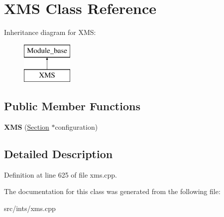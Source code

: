 \hypertarget{classXMS}{\section{X\-M\-S Class Reference}
\label{classXMS}
}
Inheritance diagram for X\-M\-S\-:\begin{figure}[H]
\begin{center}
\leavevmode
\includegraphics[height=2.000000cm]{classXMS}
\end{center}
\end{figure}
\subsection*{Public Member Functions}
\begin{DoxyCompactItemize}
\item 
\hypertarget{classXMS_a09c1f705bac7231151e025c1444f8c2c}{{\bfseries X\-M\-S} (\hyperlink{classSection}{Section} $\ast$configuration)}\label{classXMS_a09c1f705bac7231151e025c1444f8c2c}

\end{DoxyCompactItemize}


\subsection{Detailed Description}


Definition at line 625 of file xms.\-cpp.



The documentation for this class was generated from the following file\-:\begin{DoxyCompactItemize}
\item 
src/ints/xms.\-cpp\end{DoxyCompactItemize}
